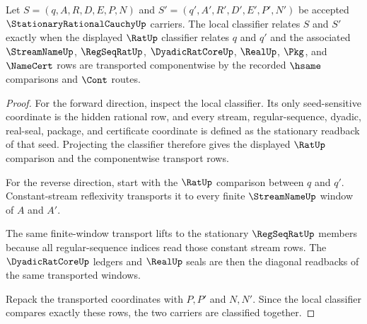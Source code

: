 \begin{theorem}
\label{thm:stationary-rational-cauchy-classifier-correspondence}
Let $S=(q,A,R,D,E,P,N)$ and $S'=(q',A',R',D',E',P',N')$ be accepted $\StationaryRationalCauchyUp$ carriers. The local classifier relates $S$ and $S'$ exactly when the displayed $\RatUp$ classifier relates $q$ and $q'$ and the associated $\StreamNameUp$, $\RegSeqRatUp$, $\DyadicRatCoreUp$, $\RealUp$, $\Pkg$, and $\NameCert$ rows are transported componentwise by the recorded $\hsame$ comparisons and $\Cont$ routes.
\end{theorem}
\begin{proof}
For the forward direction, inspect the local classifier. Its only seed-sensitive coordinate is the hidden rational row, and every stream, regular-sequence, dyadic, real-seal, package, and certificate coordinate is defined as the stationary readback of that seed. Projecting the classifier therefore gives the displayed $\RatUp$ comparison and the componentwise transport rows.

For the reverse direction, start with the $\RatUp$ comparison between $q$ and $q'$. Constant-stream reflexivity transports it to every finite $\StreamNameUp$ window of $A$ and $A'$.

The same finite-window transport lifts to the stationary $\RegSeqRatUp$ members because all regular-sequence indices read those constant stream rows. The $\DyadicRatCoreUp$ ledgers and $\RealUp$ seals are then the diagonal readbacks of the same transported windows.

Repack the transported coordinates with $P,P'$ and $N,N'$. Since the local classifier compares exactly these rows, the two carriers are classified together.
\end{proof}

